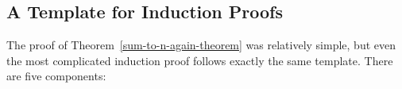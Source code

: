 \iffalse
\begin{notesproblem}
Prove by induction on $n$ that
\hyperdef{geometric}{sum}{\begin{equation}\label{geometric-n}
1+r+r^2+\cdots+r^n = \frac{r^{n+1}-1}{r-1}
\end{equation}}
for all $n \in \naturals$ and numbers $r\neq 1$.
\end{notesproblem}
\fi

\subsection{A Template for Induction Proofs}
\label{templ-induct-proofs}

The proof of Theorem~\ref{sum-to-n-again-theorem} was relatively simple,
but even the most complicated induction proof follows exactly the same
template.  There are five components:

